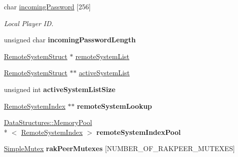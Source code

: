 \begin{DoxyCompactItemize}
\item 
\hypertarget{class_rak_net_1_1_rak_peer_a79fac920e5b3388a3e1eb9ef5ebea60f}{char \hyperlink{class_rak_net_1_1_rak_peer_a79fac920e5b3388a3e1eb9ef5ebea60f}{incoming\-Password} \mbox{[}256\mbox{]}}\label{class_rak_net_1_1_rak_peer_a79fac920e5b3388a3e1eb9ef5ebea60f}

\begin{DoxyCompactList}\small\item\em Local Player I\-D. \end{DoxyCompactList}\item 
\hypertarget{class_rak_net_1_1_rak_peer_ae6b230d384c92509bb338cf8514d99b0}{unsigned char {\bfseries incoming\-Password\-Length}}\label{class_rak_net_1_1_rak_peer_ae6b230d384c92509bb338cf8514d99b0}

\item 
\hyperlink{struct_rak_net_1_1_rak_peer_1_1_remote_system_struct}{Remote\-System\-Struct} $\ast$ \hyperlink{class_rak_net_1_1_rak_peer_a433a287f35dd77985ae4ac579e6adf76}{remote\-System\-List}
\item 
\hyperlink{struct_rak_net_1_1_rak_peer_1_1_remote_system_struct}{Remote\-System\-Struct} $\ast$$\ast$ \hyperlink{class_rak_net_1_1_rak_peer_ad8cab96454717bfcbc2cfda6f88d8cc0}{active\-System\-List}
\item 
\hypertarget{class_rak_net_1_1_rak_peer_a5b7014ae1ac68ce407c83f0697627f14}{unsigned int {\bfseries active\-System\-List\-Size}}\label{class_rak_net_1_1_rak_peer_a5b7014ae1ac68ce407c83f0697627f14}

\item 
\hypertarget{class_rak_net_1_1_rak_peer_a9d3a8436e5faef994172bf022508fbf5}{\hyperlink{struct_rak_net_1_1_remote_system_index}{Remote\-System\-Index} $\ast$$\ast$ {\bfseries remote\-System\-Lookup}}\label{class_rak_net_1_1_rak_peer_a9d3a8436e5faef994172bf022508fbf5}

\item 
\hypertarget{class_rak_net_1_1_rak_peer_aec02bdff28e7e18bbd0c8c2f7abfa4d0}{\hyperlink{class_data_structures_1_1_memory_pool}{Data\-Structures\-::\-Memory\-Pool}\\*
$<$ \hyperlink{struct_rak_net_1_1_remote_system_index}{Remote\-System\-Index} $>$ {\bfseries remote\-System\-Index\-Pool}}\label{class_rak_net_1_1_rak_peer_aec02bdff28e7e18bbd0c8c2f7abfa4d0}

\item 
\hypertarget{class_rak_net_1_1_rak_peer_a11e473994976ac3080f26d9410e3619a}{\hyperlink{class_rak_net_1_1_simple_mutex}{Simple\-Mutex} {\bfseries rak\-Peer\-Mutexes} \mbox{[}N\-U\-M\-B\-E\-R\-\_\-\-O\-F\-\_\-\-R\-A\-K\-P\-E\-E\-R\-\_\-\-M\-U\-T\-E\-X\-E\-S\mbox{]}}\label{class_rak_net_1_1_rak_peer_a11e473994976ac3080f26d9410e3619a}


\end{DoxyCompactItemize}

